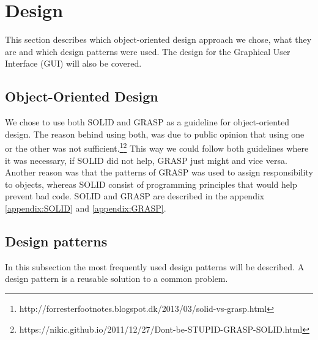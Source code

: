 
\section{Design}
This section describes which object-oriented design approach we chose,
 what they are and which design patterns were used. The design for the
 Graphical User Interface (GUI) will also be covered.

		\subsection{Object-Oriented Design}
We chose to use both SOLID and GRASP as a guideline for object-oriented
 design. The reason behind using both, was due to public opinion that using
  one or the other was not
	sufficient.\footnote{http://forresterfootnotes.blogspot.dk/2013/03/solid-vs-grasp.html}\footnote{https://nikic.github.io/2011/12/27/Dont-be-STUPID-GRASP-SOLID.html}
  This way we could follow both guidelines where it was necessary, if
  SOLID did not help, GRASP just might and vice versa. Another reason
   was that the patterns of GRASP was used to assign responsibility to
    objects, whereas SOLID consist of programming principles that would
    help prevent bad code. SOLID and GRASP are described in the appendix \ref{appendix:SOLID} and \ref{appendix:GRASP}.
		\subsection{Design patterns}
In this subsection the most frequently used design patterns will be described.
 A design pattern is a reusable solution to a common problem.
